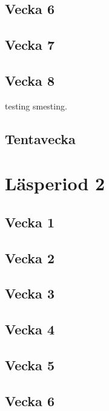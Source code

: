 \section{Vecka 6}


\section{Vecka 7}


\section{Vecka 8}

testing smesting.

\section{Tentavecka}



\chapter{Läsperiod 2}
\section{Vecka 1}


\section{Vecka 2}


\section{Vecka 3}


\section{Vecka 4}


\section{Vecka 5}


\section{Vecka 6}


% 

